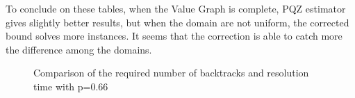 \documentclass[jair,twoside,11pt,theapa]{article}
\begin{document}
To conclude on these tables, when the Value Graph is complete, PQZ estimator gives slightly better results, but when the domain are not uniform, the corrected bound solves more instances. It seems that the correction is able to catch more the difference among the domains.


%       
%       

\begin{figure}
   \centering
   \begin{minipage}[c]{.46\linewidth}
       
   \end{minipage} \hfill
   \begin{minipage}[c]{.46\linewidth}
       
   \end{minipage}
   \caption{Comparison of the required number of backtracks and resolution time with p=0.66}
   \label{benchCloudPointsp066}
\end{figure}

%       
%       
\end{document}
